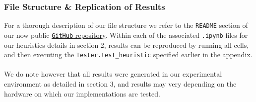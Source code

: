 \documentclass[a4paper,10pt]{article}
\begin{document}
\subsubsection*{File Structure \& Replication of Results}
For a thorough description of our file structure we refer to the \texttt{README} section of our now public \href{https://github.com/Seannnnnnnnnnn/QAP}{\texttt{GitHub} repository}. Within each of the associated \texttt{.ipynb} files for our heuristics details in section 2, results can be reproduced by running all cells, and then executing the \texttt{Tester.test\_heuristic} specified earlier in the appendix. \\
\\
We do note however that all results were generated in our experimental environment as detailed in section 3, and results may very depending on the hardware on which our implementations are tested.



\newpage

\end{document}

